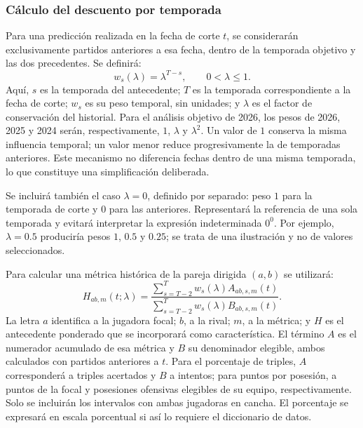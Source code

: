 \subsubsection*{Cálculo del descuento por temporada}
Para una predicción realizada en la fecha de corte $t$, se considerarán exclusivamente partidos anteriores a esa fecha, dentro de la temporada objetivo y las dos precedentes. Se definirá:
\begin{equation}
 w_s(\lambda)=\lambda^{T-s},\qquad 0<\lambda\leq 1.
 \label{eq:descuento-temporada-613}
\end{equation}
Aquí, $s$ es la temporada del antecedente; $T$ es la temporada correspondiente a la fecha de corte; $w_s$ es su peso temporal, sin unidades; y $\lambda$ es el factor de conservación del historial. Para el análisis objetivo de 2026, los pesos de 2026, 2025 y 2024 serán, respectivamente, $1$, $\lambda$ y $\lambda^2$. Un valor de $1$ conserva la misma influencia temporal; un valor menor reduce progresivamente la de temporadas anteriores. Este mecanismo no diferencia fechas dentro de una misma temporada, lo que constituye una simplificación deliberada.

Se incluirá también el caso $\lambda=0$, definido por separado: peso $1$ para la temporada de corte y $0$ para las anteriores. Representará la referencia de una sola temporada y evitará interpretar la expresión indeterminada $0^0$. Por ejemplo, $\lambda=0.5$ produciría pesos $1$, $0.5$ y $0.25$; se trata de una ilustración y no de valores seleccionados.

Para calcular una métrica histórica de la pareja dirigida $(a,b)$ se utilizará:
\begin{equation}
 H_{ab,m}(t;\lambda)=
 \frac{\sum_{s=T-2}^{T}w_s(\lambda)A_{ab,s,m}(t)}
 {\sum_{s=T-2}^{T}w_s(\lambda)B_{ab,s,m}(t)}.
 \label{eq:antecedente-ponderado-613}
\end{equation}
La letra $a$ identifica a la jugadora focal; $b$, a la rival; $m$, a la métrica; y $H$ es el antecedente ponderado que se incorporará como característica. El término $A$ es el numerador acumulado de esa métrica y $B$ su denominador elegible, ambos calculados con partidos anteriores a $t$. Para el porcentaje de triples, $A$ corresponderá a triples acertados y $B$ a intentos; para puntos por posesión, a puntos de la focal y posesiones ofensivas elegibles de su equipo, respectivamente. Solo se incluirán los intervalos con ambas jugadoras en cancha. El porcentaje se expresará en escala porcentual si así lo requiere el diccionario de datos.

